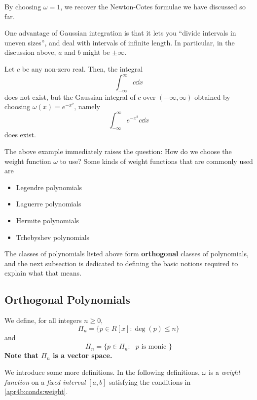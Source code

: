\begin{rmk}
  By choosing $\omega = 1$, we recover the Newton-Cotes formulae we have discussed so far.
\end{rmk}

One advantage of Gaussian integration is that it lets you ``divide intervals in uneven sizes'', and deal with intervals of infinite length. In particular, in the discussion above, $a$ and $b$ might be $\pm \infty$.

\begin{example}
  Let $c$ be any non-zero real. Then, the integral
  \[
    \int_{-\infty}^{\infty} c \dd{x}
  \]
  does not exist, but the Gaussian integral of $c$ over $(-\infty, \infty)$ obtained by choosing $\omega(x) = e^{-x^2}$, namely
  \[
    \int_{-\infty}^{\infty} e^{-x^2} c \dd{x}
  \]
  does exist.
\end{example}

The above example immediately raises the question: How do we choose the weight function $\omega$ to use? Some kinds of weight functions that are commonly used are
\begin{itemize}
\item
  Legendre polynomials
\item
  Laguerre polynomials
\item
  Hermite polynomials
\item
  Tchebyshev polynomials
\end{itemize}

The classes of polynomials listed above form \textbf{orthogonal} classes of polynomials, and the next subsection is dedicated to defining the basic notions required to explain what that means.

\subsection{Orthogonal Polynomials}

\begin{defn}
  We define, for all integers $n \geq 0$,
  \[
    \Pi_n = \{p \in R[x] \colon \deg(p) \leq n \}
  \]
  and
  \[
    \overline{\Pi}_n = \{p \in \Pi_n \colon \text{ $p$ is monic } \}
  \]
  \textbf{Note that $\Pi_n$ is a vector space.}
\end{defn}
We introduce some more definitions. In the following definitions, $\omega$ is a \textit{weight function} on a \textit{fixed interval} $[a, b]$ satisfying the conditions in \ref{apr4b:conds:weight}.

